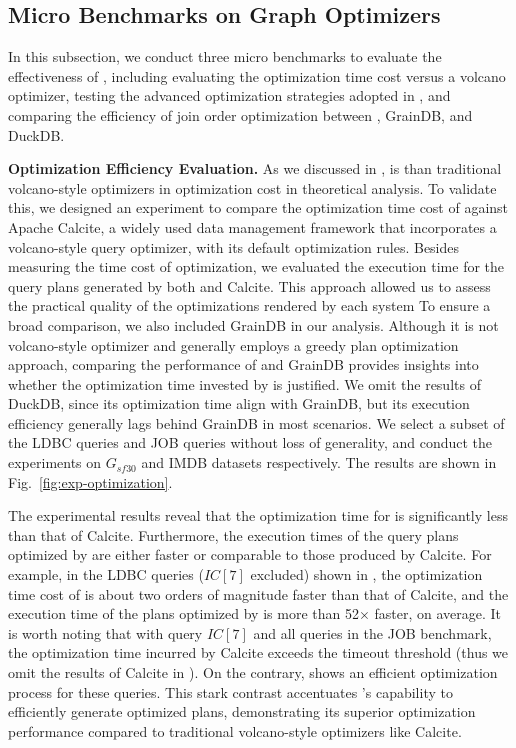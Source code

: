 \subsection{Micro Benchmarks on Graph Optimizers}
\label{sec:experiment-opt}
In this subsection, we conduct three micro benchmarks to evaluate the effectiveness of \name, 
including evaluating the optimization time cost versus a volcano optimizer, testing the advanced optimization strategies adopted in \name, and comparing the efficiency of join order optimization between \name, GrainDB, and DuckDB.

\noindent\textbf{Optimization Efficiency Evaluation.}
As we discussed in , \name is  than traditional volcano-style optimizers in optimization cost in theoretical analysis.
To validate this, we designed an experiment to compare the optimization time cost of \name against Apache Calcite, a widely used data management framework that incorporates a volcano-style query optimizer, with its default optimization rules.
Besides measuring the time cost of optimization, we evaluated the execution time for the query plans generated by both \name and Calcite. This approach allowed us to assess the practical quality of the optimizations rendered by each system
To ensure a broad comparison, we also included GrainDB in our analysis. Although it is not volcano-style optimizer and generally employs a greedy plan optimization approach,
comparing the performance of \name and GrainDB provides insights into whether the optimization time invested by \name is justified.
We omit the results of DuckDB, since its optimization time align with GrainDB, but its execution efficiency generally lags behind GrainDB in most scenarios.
We select a subset of the LDBC queries and JOB queries without loss of generality, and conduct the experiments on $G_{sf30}$ and IMDB datasets respectively.
The results are shown in Fig.~\ref{fig:exp-optimization}.

The experimental results reveal that the optimization time for \name is significantly less than that of Calcite. 
Furthermore, the execution times of the query plans optimized by \name are either faster or comparable to those produced by Calcite.
For example, in the LDBC queries ($IC[7]$ excluded) shown in , the optimization time cost of \name is about two orders of magnitude faster than that of Calcite, and the execution time of the plans optimized by \name is more than 52$\times$ faster, on average.
It is worth noting that with query $IC[7]$ and all queries in the JOB benchmark, the optimization time incurred by Calcite exceeds the timeout threshold (thus we omit the results of Calcite in ).
On the contrary, \name shows an efficient optimization process for these queries. 
This stark contrast accentuates \name's capability to efficiently generate optimized plans, demonstrating its superior optimization performance compared to traditional volcano-style optimizers like Calcite.

